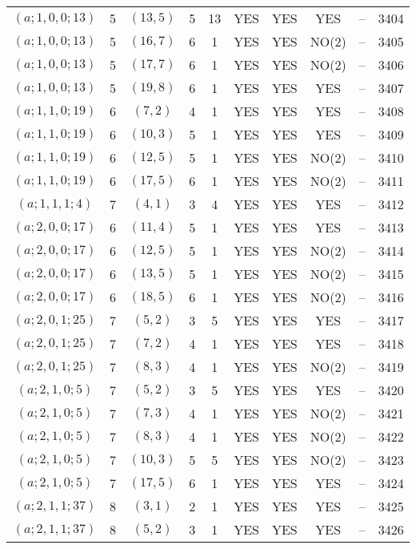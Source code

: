 \begin{longtable}{|c|c|c|c|c|c|c|c|c|c|}
$(a; 1, 0, 0; 13)$ & 5 & $(13, 5)$ & 5 & 13 & YES & YES & YES & -- & 3404\\
$(a; 1, 0, 0; 13)$ & 5 & $(16, 7)$ & 6 & 1 & YES & YES & NO(2) & -- & 3405\\
$(a; 1, 0, 0; 13)$ & 5 & $(17, 7)$ & 6 & 1 & YES & YES & NO(2) & -- & 3406\\
$(a; 1, 0, 0; 13)$ & 5 & $(19, 8)$ & 6 & 1 & YES & YES & YES & -- & 3407\\
$(a; 1, 1, 0; 19)$ & 6 & $(7, 2)$ & 4 & 1 & YES & YES & YES & -- & 3408\\
$(a; 1, 1, 0; 19)$ & 6 & $(10, 3)$ & 5 & 1 & YES & YES & YES & -- & 3409\\
$(a; 1, 1, 0; 19)$ & 6 & $(12, 5)$ & 5 & 1 & YES & YES & NO(2) & -- & 3410\\
$(a; 1, 1, 0; 19)$ & 6 & $(17, 5)$ & 6 & 1 & YES & YES & NO(2) & -- & 3411\\
$(a; 1, 1, 1; 4)$ & 7 & $(4, 1)$ & 3 & 4 & YES & YES & YES & -- & 3412\\
$(a; 2, 0, 0; 17)$ & 6 & $(11, 4)$ & 5 & 1 & YES & YES & YES & -- & 3413\\
$(a; 2, 0, 0; 17)$ & 6 & $(12, 5)$ & 5 & 1 & YES & YES & NO(2) & -- & 3414\\
$(a; 2, 0, 0; 17)$ & 6 & $(13, 5)$ & 5 & 1 & YES & YES & NO(2) & -- & 3415\\
$(a; 2, 0, 0; 17)$ & 6 & $(18, 5)$ & 6 & 1 & YES & YES & NO(2) & -- & 3416\\
$(a; 2, 0, 1; 25)$ & 7 & $(5, 2)$ & 3 & 5 & YES & YES & YES & -- & 3417\\
$(a; 2, 0, 1; 25)$ & 7 & $(7, 2)$ & 4 & 1 & YES & YES & YES & -- & 3418\\
$(a; 2, 0, 1; 25)$ & 7 & $(8, 3)$ & 4 & 1 & YES & YES & NO(2) & -- & 3419\\
$(a; 2, 1, 0; 5)$ & 7 & $(5, 2)$ & 3 & 5 & YES & YES & YES & -- & 3420\\
$(a; 2, 1, 0; 5)$ & 7 & $(7, 3)$ & 4 & 1 & YES & YES & NO(2) & -- & 3421\\
$(a; 2, 1, 0; 5)$ & 7 & $(8, 3)$ & 4 & 1 & YES & YES & NO(2) & -- & 3422\\
$(a; 2, 1, 0; 5)$ & 7 & $(10, 3)$ & 5 & 5 & YES & YES & NO(2) & -- & 3423\\
$(a; 2, 1, 0; 5)$ & 7 & $(17, 5)$ & 6 & 1 & YES & YES & YES & -- & 3424\\
$(a; 2, 1, 1; 37)$ & 8 & $(3, 1)$ & 2 & 1 & YES & YES & YES & -- & 3425\\
$(a; 2, 1, 1; 37)$ & 8 & $(5, 2)$ & 3 & 1 & YES & YES & YES & -- & 3426\\

\end{longtable}

